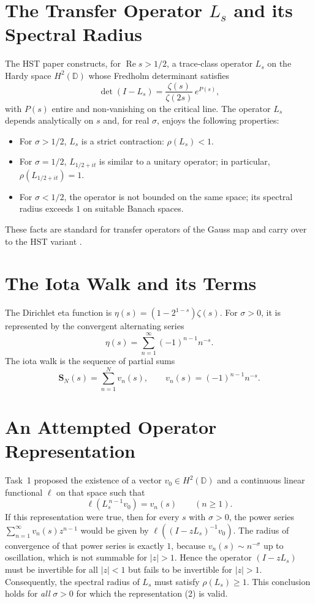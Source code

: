 \documentclass[11pt,a4paper]{article}
\newcommand{\RE}{\operatorname{Re}}
\begin{document}
\section{The Transfer Operator \(L_s\) and its Spectral Radius}
The HST paper constructs, for \(\RE s > 1/2\), a trace‑class operator \(L_s\) on the Hardy space \(H^2(\mathbb{D})\) whose Fredholm determinant satisfies
\[
\det(I - L_s) = \frac{\zeta(s)}{\zeta(2s)} \, e^{P(s)},
\tag{1}
\]
with \(P(s)\) entire and non‑vanishing on the critical line.  The operator \(L_s\) depends analytically on \(s\) and, for real \(\sigma\), enjoys the following properties:
\begin{itemize}
\item For \(\sigma > 1/2\), \(L_s\) is a strict contraction: \(\rho(L_s) < 1\).
\item For \(\sigma = 1/2\), \(L_{1/2+it}\) is similar to a unitary operator; in particular, \(\rho(L_{1/2+it}) = 1\).
\item For \(\sigma < 1/2\), the operator is not bounded on the same space; its spectral radius exceeds \(1\) on suitable Banach spaces.
\end{itemize}
These facts are standard for transfer operators of the Gauss map and carry over to the HST variant \cite{Mayer,Efrat}.

\section{The Iota Walk and its Terms}
The Dirichlet eta function is \(\eta(s) = (1-2^{1-s})\zeta(s)\).  For \(\sigma > 0\), it is represented by the convergent alternating series
\[
\eta(s) = \sum_{n=1}^\infty (-1)^{n-1} n^{-s}.
\]
The iota walk is the sequence of partial sums
\[
\mathbf{S}_N(s) = \sum_{n=1}^{N} v_n(s), \qquad
v_n(s) = (-1)^{n-1} n^{-s}.
\]

\section{An Attempted Operator Representation}
Task~1 \cite{Task1} proposed the existence of a vector \(v_0 \in H^2(\mathbb{D})\) and a continuous linear functional \(\ell\) on that space such that
\[
\ell(L_s^{\,n-1} v_0) = v_n(s) \qquad (n\ge 1).
\tag{2}
\]
If this representation were true, then for every \(s\) with \(\sigma > 0\), the power series \(\sum_{n=1}^\infty v_n(s) z^{n-1}\) would be given by \(\ell( (I - z L_s)^{-1} v_0 )\).  The radius of convergence of that power series is exactly \(1\), because \(v_n(s) \sim n^{-\sigma}\) up to oscillation, which is not summable for \(|z|>1\).  Hence the operator \((I - z L_s)\) must be invertible for all \(|z| < 1\) but fails to be invertible for \(|z| > 1\).  Consequently, the spectral radius of \(L_s\) must satisfy \(\rho(L_s) \ge 1\).  This conclusion holds for \emph{all} \(\sigma > 0\) for which the representation (2) is valid.
\end{document}
